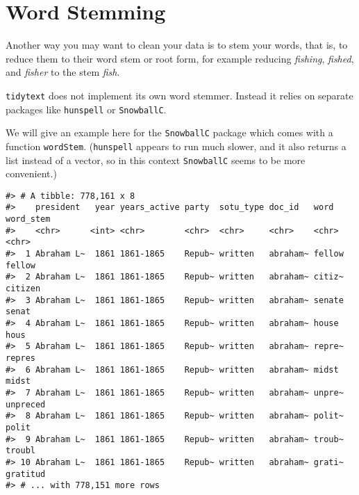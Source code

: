 \documentclass[]{book}
\newenvironment{Shaded}{\begin{snugshade}}{\end{snugshade}}
\newcommand{\DataTypeTok}[1]{\textcolor[rgb]{0.13,0.29,0.53}{#1}}
\newcommand{\KeywordTok}[1]{\textcolor[rgb]{0.13,0.29,0.53}{\textbf{#1}}}
\newcommand{\NormalTok}[1]{#1}
\newcommand{\OperatorTok}[1]{\textcolor[rgb]{0.81,0.36,0.00}{\textbf{#1}}}
\newcommand{\StringTok}[1]{\textcolor[rgb]{0.31,0.60,0.02}{#1}}
\begin{document}
\hypertarget{word-stemming}{%
\section{Word Stemming}\label{word-stemming}}

Another way you may want to clean your data is to stem your words, that is, to reduce them to their word stem or root form, for example reducing \emph{fishing}, \emph{fished}, and \emph{fisher} to the stem \emph{fish}.

\texttt{tidytext} does not implement its own word stemmer. Instead it relies on separate packages like \texttt{hunspell} or \texttt{SnowballC}.

We will give an example here for the \texttt{SnowballC} package which comes with a function \texttt{wordStem}. (\texttt{hunspell} appears to run much slower, and it also returns a list instead of a vector, so in this context \texttt{SnowballC} seems to be more convenient.)

\begin{Shaded}
\end{Shaded}

\begin{verbatim}
#> # A tibble: 778,161 x 8
#>    president   year years_active party  sotu_type doc_id   word   word_stem
#>    <chr>      <int> <chr>        <chr>  <chr>     <chr>    <chr>  <chr>    
#>  1 Abraham L~  1861 1861-1865    Repub~ written   abraham~ fellow fellow   
#>  2 Abraham L~  1861 1861-1865    Repub~ written   abraham~ citiz~ citizen  
#>  3 Abraham L~  1861 1861-1865    Repub~ written   abraham~ senate senat    
#>  4 Abraham L~  1861 1861-1865    Repub~ written   abraham~ house  hous     
#>  5 Abraham L~  1861 1861-1865    Repub~ written   abraham~ repre~ repres   
#>  6 Abraham L~  1861 1861-1865    Repub~ written   abraham~ midst  midst    
#>  7 Abraham L~  1861 1861-1865    Repub~ written   abraham~ unpre~ unpreced 
#>  8 Abraham L~  1861 1861-1865    Repub~ written   abraham~ polit~ polit    
#>  9 Abraham L~  1861 1861-1865    Repub~ written   abraham~ troub~ troubl   
#> 10 Abraham L~  1861 1861-1865    Repub~ written   abraham~ grati~ gratitud 
#> # ... with 778,151 more rows
\end{verbatim}
\end{document}
